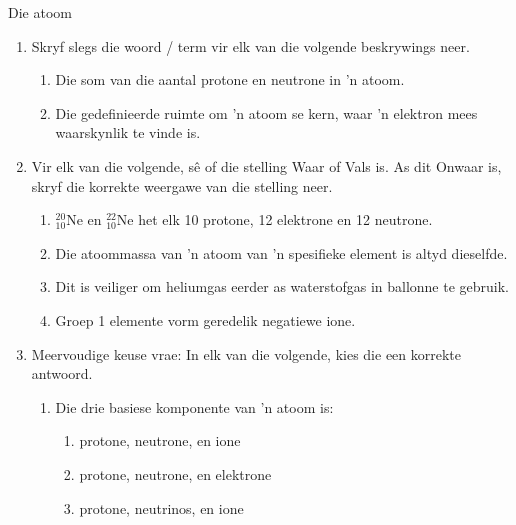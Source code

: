 \begin{eocexercises}{Die atoom}
            \nopagebreak
      \label{m38741*id263110}\begin{enumerate}[noitemsep, label=\textbf{\arabic*}. ] 
            \label{m38741*uid189}\item Skryf slegs die woord / term vir elk van die volgende beskrywings neer.
\label{m38741*id263126}\begin{enumerate}[noitemsep, label=\textbf{\alph*}. ] 
            \label{m38741*uid190}\item Die som van die aantal protone en neutrone in 'n atoom.
\label{m38741*uid191}\item Die gedefinieerde ruimte om 'n atoom se kern, waar 'n elektron mees waarskynlik te vinde is.
\end{enumerate}
                \label{m38741*uid192}\item Vir elk van die volgende, sê of die stelling Waar of Vals is. As dit Onwaar is, skryf die korrekte weergawe van die stelling neer.
\label{m38741*id263169}\begin{enumerate}[noitemsep, label=\textbf{\alph*}. ] 
            \label{m38741*uid193}\item $_{10}^{20}\text{Ne}$ en $_{10}^{22}\text{Ne}$ het elk 10 protone, 12 elektrone en 12 neutrone.
\label{m38741*uid194}\item Die atoommassa van 'n atoom van 'n spesifieke element is altyd dieselfde.
\label{m38741*uid195}\item Dit is veiliger om heliumgas eerder as waterstofgas in ballonne te gebruik.
\label{m38741*uid196}\item Groep 1 elemente vorm geredelik negatiewe ione.
\end{enumerate}
                \label{m38741*uid197}\item Meervoudige keuse vrae: In elk van die volgende, kies die een korrekte antwoord.
\label{m38741*id263273}\begin{enumerate}[noitemsep, label=\textbf{\alph*}. ] 
            \label{m38741*uid198}\item Die drie basiese komponente van 'n atoom is:
\label{m38741*id263289}\begin{enumerate}[noitemsep, label=\textbf{\alph*}. ] 
            \label{m38741*uid199}\item protone, neutrone, en ione
\label{m38741*uid200}\item protone, neutrone, en elektrone
\label{m38741*uid201}\item protone, neutrinos, en ione

\end{enumerate}
\end{enumerate}
\end{enumerate}
\end{eocexercises}
